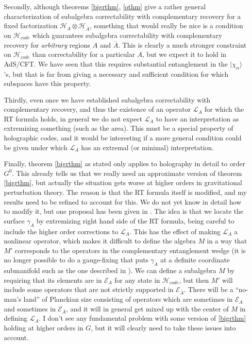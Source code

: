 \documentclass[12pt]{article}
\newcommand{\ran}{\rangle}
\newcommand{\Ll}{\mathcal{L}}
\newcommand{\HA}{\mathcal{H}_A}
\newcommand{\HAb}{\mathcal{H}_{\ol{A}}}
\newcommand{\Ab}{\ol{A}}
\newcommand{\Hc}{\mathcal{H}_{code}}
\newcommand{\LA}{\Ll_A}
\newcommand{\ol}{\overline}
\newcommand{\EA}{\mathcal{E}_A}
\begin{document}
Secondly, although theorems \ref{bigrthm}, \ref{othm} give a rather general characterization of subalgebra correctability with complementary recovery for a fixed factorization $\HA\otimes \HAb$, something that would really be nice is a condition on $\Hc$ which guarantees subalgebra correctability with complementary recovery for \textit{arbitrary} regions $A$ and $\Ab$.  This is clearly a much stronger constraint on $\Hc$ than correctability for a particular $A$, but we expect it to hold in AdS/CFT.  We have seen that this requires substantial entanglement in the $|\chi_\alpha\ran$'s, but that is far from giving a necessary and sufficient condition for which subspaces have this property.  

Thirdly, even once we have established subalgebra correctability with complementary recovery, and thus the existence of an operator $\LA$ for which the RT formula holds, in general we do not expect $\LA$ to have an interpretation as extremizing something (such as the area).  This must be a special property of holographic codes, and it would be interesting if a more general condition could be given under which $\LA$ has an extremal (or minimal) interpretation.

Finally, theorem \ref{bigrthm} as stated only applies to holography in detail to order $G^0$.  This already tells us that we really need an approximate version of theorem \ref{bigrthm}, but actually the situation gets worse at higher orders in gravitational perturbation theory.  The reason is that the RT formula itself is modified, and my results need to be refined to account for this.  We do not yet know in detail how to modify it, but one proposal has been given in \cite{Engelhardt:2014gca}.  The idea is that we locate the surface $\gamma_A$ by extremizing right hand side of the RT formula, being careful to include the higher order corrections to $\LA$.  This has the effect of making $\LA$ a nonlinear operator, which makes it difficult to define the algebra $M$ in a way that $M'$ corresponds to the operators in the complementary entanglement wedge (it is no longer possible to do a gauge-fixing that puts $\gamma_A$ at a definite coordinate submanifold such as the one described in \cite{Jafferis:2015del}).  We can define a subalgebra $M$ by requiring that its elements are in $\EA$ for any state in $\Hc$, but then $M'$ will include some operators that are not strictly supported in $\mathcal{E}_{\Ab}$.  There will be a ``no-man's land'' of Planckian size consisting of operators which are sometimes in $\EA$ and sometimes in $\mathcal{E}_{\Ab}$, and it will in general get mixed up with the center of $M$ in defining $\LA$.  I don't see any fundamental problem with some version of \ref{bigrthm} holding at higher orders in $G$, but it will clearly need to take these issues into account.
  
\end{document}
